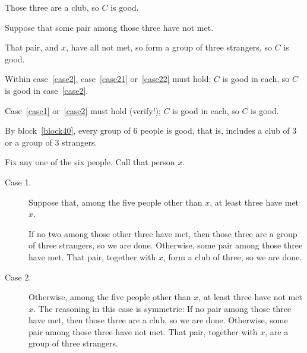 \documentclass[11pt]{article}
\begin{document}
\begin{problems}
\begin{longFormProof}
\begin{block}[block40]
\begin{case}[case2]
\begin{case}[case21]
          \step Those three are a club, so $C$ is good.
        \end{case}

        \begin{case}[case22]
          {Suppose that some pair among those three have not met.}

          \step That pair, and $x$, have all not met, so form a group of three strangers, 
          so $C$ is good.
        \end{case}

        \step  Within case~\ref{case2}, case~\ref{case21} or~\ref{case22} must hold;
        $C$ is good in each, 
        so $C$ is good in case~\ref{case2}.
      
      \end{case}

      \step Case~\ref{case1} or~\ref{case2} must hold (verify!);
      $C$ is good in each,
      so $C$ is good.
    \end{block}

    \step By block~\ref{block40}, every group of 6 people is good,
    that is, includes a club of 3 or a group of 3 strangers.
  \end{longFormProof}
  
  \begin{shortFormProof}
    Fix any one of the six people.  Call that person $x$.
    \begin{description}
    \item[Case 1.] Suppose that, among the five people other than $x$, 
      at least three have met $x$.

      If no two among those other three have met, 
      then those three are a group of three strangers,  so we are done.
      Otherwise, some pair among those three have met.
      That pair, together with $x$, form a club of three, so we are done.

    \item[Case 2.] Otherwise, among the five people other than $x$, 
      at least three have not met $x$.
      The reasoning in this case is symmetric:
      If no pair among those three have met, then those three are a club,
      so we are done.
      Otherwise, some pair among those three have not met.
      That pair, together with $x$, are a group of three strangers.
    \end{description}
  \end{shortFormProof}
\end{problems}
\end{document}
